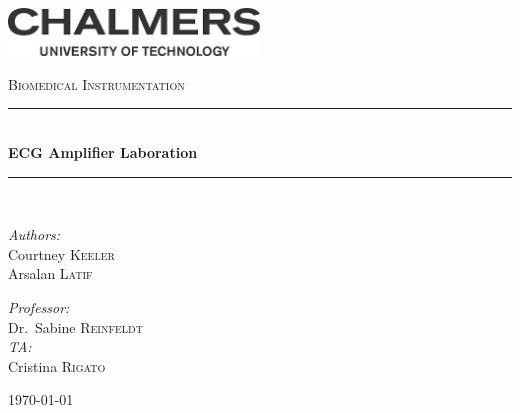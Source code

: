 \documentclass[pdftex,12pt,letterpaper]{article}
\newcommand{\HRule}{\rule{\linewidth}{0.5mm}}
\begin{document}

\begin{titlepage}
\begin{center}

\includegraphics[width=0.5\textwidth]{./logo}~\\[1cm]

\vspace{4cm}

\textsc{\Large Biomedical Instrumentation}\\[0.5cm]

\HRule \\[0.4cm]
{ \huge \bfseries ECG Amplifier Laboration \\[0.4cm] }

\HRule \\[1.5cm]

\noindent
\begin{minipage}{0.4\textwidth}
\begin{flushleft} \large
\emph{Authors:}\\
Courtney \textsc{Keeler} \\
Arsalan \textsc{Latif}
\end{flushleft}
\end{minipage}%
\begin{minipage}{0.4\textwidth}
\begin{flushright} \large
\emph{Professor:} \\
Dr.~Sabine \textsc{Reinfeldt} \\
\emph{TA:} \\
Cristina \textsc{Rigato}
\end{flushright}
\end{minipage}

\vfill

{\large \today}

\end{center}
\end{titlepage}
\end{document}
